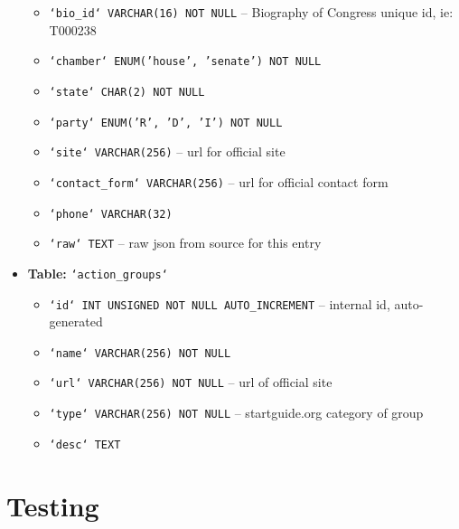 \documentclass[12pt]{article}
\newcommand{\code}[1]{\texttt{#1}}
\begin{document}
\begin{itemize}[font=\bfseries,leftmargin=0px,label=]
\begin{itemize}
		\item \code{`bio\_id` VARCHAR(16) NOT NULL}				-- Biography of Congress unique id, ie: T000238
		\item \code{`chamber` ENUM('house', 'senate') NOT NULL}
		\item \code{`state` CHAR(2) NOT NULL}
		\item \code{`party` ENUM('R', 'D', 'I') NOT NULL}
		\item \code{`site` VARCHAR(256)}						-- url for official site
		\item \code{`contact\_form` VARCHAR(256)}				-- url for official contact form
		\item \code{`phone` VARCHAR(32)}
		\item \code{`raw` TEXT}									-- raw json from source for this entry
	\end{itemize} \pagebreak
	\item \textbf{Table:} \code{`action\_groups`}
	\begin{itemize}
		\item \code{`id` INT UNSIGNED NOT NULL AUTO\_INCREMENT}	-- internal id, auto-generated
		\item \code{`name` VARCHAR(256) NOT NULL}
		\item \code{`url` VARCHAR(256) NOT NULL}				-- url of official site
		\item \code{`type` VARCHAR(256) NOT NULL}				-- startguide.org category of group
		\item \code{`desc` TEXT}
	\end{itemize}
\end{itemize}


\section{Testing}
\end{document}
